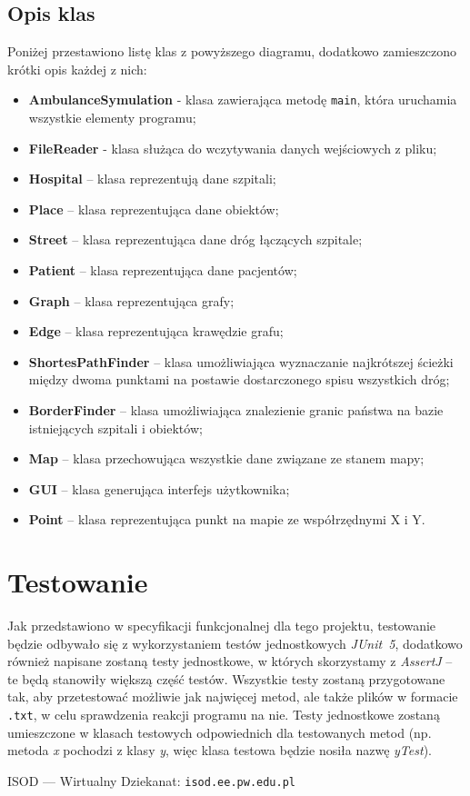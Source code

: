 \documentclass[12pt,a4paper]{article}
\begin{document}
\subsection{Opis klas}
Poniżej przestawiono listę klas z powyższego diagramu, dodatkowo zamieszczono krótki opis każdej z nich:
\begin{itemize}
\item \textbf{AmbulanceSymulation} - klasa zawierająca metodę \texttt{main}, która uruchamia wszystkie elementy programu;
\item \textbf{FileReader} - klasa służąca do wczytywania danych wejściowych z pliku;
\item \textbf{Hospital} – klasa reprezentują dane szpitali;
\item \textbf{Place} – klasa reprezentująca dane obiektów;
\item \textbf{Street} – klasa reprezentująca dane dróg łączących szpitale;
\item \textbf{Patient} – klasa reprezentująca dane pacjentów;
\item \textbf{Graph} – klasa reprezentująca grafy;
\item \textbf{Edge} – klasa reprezentująca krawędzie grafu;
\item \textbf{ShortesPathFinder} – klasa umożliwiająca wyznaczanie najkrótszej ścieżki między dwoma punktami na postawie dostarczonego spisu wszystkich dróg;
\item \textbf{BorderFinder} – klasa umożliwiająca znalezienie granic państwa na bazie istniejących szpitali i obiektów;
\item \textbf{Map} – klasa przechowująca wszystkie dane związane ze stanem mapy;
\item \textbf{GUI} – klasa generująca interfejs użytkownika;
\item \textbf{Point} – klasa reprezentująca punkt na mapie ze współrzędnymi X i Y.
\end{itemize}

\section{Testowanie}
Jak przedstawiono w specyfikacji funkcjonalnej dla tego projektu, testowanie będzie odbywało się z wykorzystaniem testów jednostkowych \textit{JUnit~5}, dodatkowo również napisane zostaną testy jednostkowe, w których skorzystamy z \textit{AssertJ} – te będą stanowiły większą część testów. Wszystkie testy zostaną przygotowane tak, aby przetestować możliwie jak najwięcej metod, ale także plików w formacie \texttt{.txt}, w celu sprawdzenia reakcji programu na nie. Testy jednostkowe zostaną umieszczone w klasach testowych odpowiednich dla testowanych metod (np. metoda \textit{x} pochodzi z klasy \textit{y}, więc klasa testowa będzie nosiła nazwę \textit{yTest}).

\begin{thebibliography}{1}
ISOD — Wirtualny Dziekanat:
\texttt{isod.ee.pw.edu.pl}
\end{thebibliography}
\end{document}
